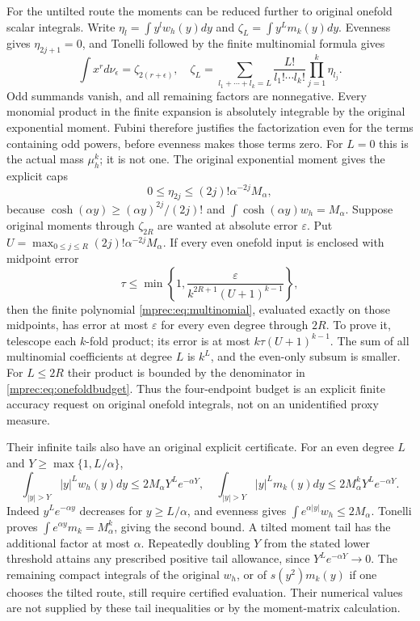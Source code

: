 \documentclass[11pt]{article}
\begin{document}
For the untilted route the moments can be reduced further to
original onefold scalar integrals. Write
$\eta_l=\int y^lw_h(y)dy$ and
$\zeta_L=\int y^Lm_k(y)dy$. Evenness gives $\eta_{2j+1}=0$,
and Tonelli followed by the finite multinomial formula gives
\begin{equation}\label{mprec:eq:multinomial}
 \int x^r d\nu_\epsilon=\zeta_{2(r+\epsilon)},\quad
 \zeta_L=\sum_{l_1+\cdots+l_k=L}
 \frac{L!}{l_1!\cdots l_k!}\prod_{j=1}^k\eta_{l_j}.
\end{equation}
Odd summands vanish, and all remaining factors are nonnegative.
Every monomial product in the finite expansion is absolutely
integrable by the original exponential moment. Fubini therefore
justifies the factorization even for the terms containing odd
powers, before evenness makes those terms zero.
For $L=0$ this is the actual mass $\mu_h^k$; it is not one.
The original exponential moment gives the explicit caps
\begin{equation}\label{mprec:eq:etaone}
 0\le\eta_{2j}\le(2j)!\alpha^{-2j}M_\alpha,
\end{equation}
because $\cosh(\alpha y)\ge(\alpha y)^{2j}/(2j)!$ and
$\int\cosh(\alpha y)w_h=M_\alpha$.
Suppose original moments through $\zeta_{2R}$ are wanted at
absolute error $\varepsilon$. Put
$U=\max_{0\le j\le R}(2j)!\alpha^{-2j}M_\alpha$.
If every even onefold input is enclosed with midpoint error
\begin{equation}\label{mprec:eq:onefoldbudget}
 \tau\le\min\left\{1,
 \frac{\varepsilon}{k^{2R+1}(U+1)^{k-1}}\right\},
\end{equation}
then the finite polynomial \eqref{mprec:eq:multinomial}, evaluated
exactly on those midpoints, has error at most $\varepsilon$
for every even degree through $2R$. To prove it, telescope each
$k$-fold product; its error is at most
$k\tau(U+1)^{k-1}$. The sum of all multinomial coefficients
at degree $L$ is $k^L$, and the even-only subsum is smaller.
For $L\le2R$ their product is bounded by the denominator in
\eqref{mprec:eq:onefoldbudget}. Thus the four-endpoint budget is an
explicit finite accuracy request on original onefold integrals,
not on an unidentified proxy measure.

Their infinite tails also have an original explicit certificate.
For an even degree $L$ and $Y\ge\max\{1,L/\alpha\}$,
\begin{equation}\label{mprec:eq:tail}
 \int_{|y|>Y}|y|^Lw_h(y)dy
 \le2M_\alpha Y^Le^{-\alpha Y},\quad
 \int_{|y|>Y}|y|^Lm_k(y)dy
 \le2M_\alpha^kY^Le^{-\alpha Y}.
\end{equation}
Indeed $y^Le^{-\alpha y}$ decreases for $y\ge L/\alpha$,
and evenness gives $\int e^{\alpha|y|}w_h\le2M_\alpha$.
Tonelli proves $\int e^{\alpha y}m_k=M_\alpha^k$, giving
the second bound. A tilted moment tail has the additional factor
at most $\alpha$. Repeatedly doubling $Y$ from the stated lower
threshold attains any prescribed positive tail allowance, since
$Y^Le^{-\alpha Y}\to0$. The remaining compact integrals of
the original $w_h$, or of $s(y^2)m_k(y)$ if one chooses the
tilted route, still require certified evaluation. Their numerical
values are not supplied by these tail inequalities or by the
moment-matrix calculation.
\end{document}
